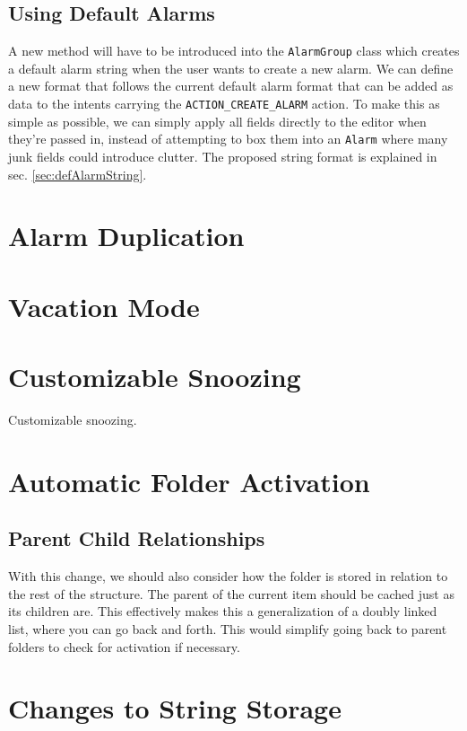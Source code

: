 \documentclass[11pt]{article} %
\begin{document}
\subsection{Using Default Alarms}
A new method will have to be introduced into the \verb|AlarmGroup| class which creates a default alarm string when the user wants to create a new alarm. We can define a new format that follows the current default alarm format that can be added as data to the intents carrying the \verb|ACTION_CREATE_ALARM| action. To make this as simple as possible, we can simply apply all fields directly to the editor when they're passed in, instead of attempting to box them into an \verb|Alarm| where many junk fields could introduce clutter. The proposed string format is explained in sec. \ref{sec:defAlarmString}. 

\section{Alarm Duplication}

\section{Vacation Mode}

\section{Customizable Snoozing}
Customizable snoozing.

\section{Automatic Folder Activation}

\subsection{Parent Child Relationships}
With this change, we should also consider how the folder is stored in relation to the rest of the structure. The parent of the current item should be cached just as its children are. This effectively makes this a generalization of a doubly linked list, where you can go back and forth. This would simplify going back to parent folders to check for activation if necessary.

\section{Changes to String Storage}
\end{document}
